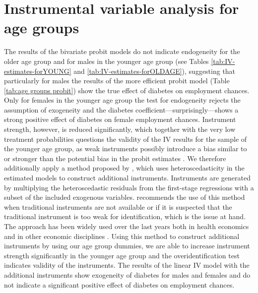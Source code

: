 \clearpage


\section{Instrumental variable analysis for age groups}

\setcounter{table}{0} 
\renewcommand{\thetable}{D\arabic{table}}

The results of the bivariate probit models do not indicate
endogeneity for the older age group and for males in the younger age
group (see Tables \ref{tab:IV-estimates-forYOUNG} and \ref{tab:IV-estimates-forOLDAGE}),
suggesting that particularly for males the results of the more efficient
probit model (Table \ref{tab:age groups probit}) show the true effect
of diabetes on employment chances. Only for females in the younger
age group the test for endogeneity rejects the assumption of exogeneity
and the diabetes coefficient---surprisingly---shows a strong positive
effect of diabetes on female employment chances. Instrument strength,
however, is reduced significantly, which together with the very low
treatment probabilities questions the validity of the \ac{IV} results
for the sample of the younger age group, as weak instruments possibly
introduce a bias similar to or stronger than the potential bias in
the probit estimates \parencite{Staiger1997}. We therefore additionally
apply a method proposed by \textcite{Lewbel2012}, which uses heteroscedasticity
in the estimated models to construct additional instruments. Instruments
are generated by multiplying the heteroscedastic residuals from the
first-stage regressions with a subset of the included exogenous variables.
\textcite{Lewbel2012} recommends the use of this method when traditional
instruments are not available or if it is suspected that the traditional
instrument is too weak for identification, which is the issue at hand.
The approach has been widely used over the last years both in health
economics \parencite{Drichoutis2011,Kelly2012,Schroeter2012,Brown2014}
and in other economic disciplines \parencite{Huang2009a,Emran2012,Denny2013}.
Using this method to construct additional instruments by using our
age group dummies, we are able to increase instrument strength significantly
in the younger age group and the overidentification test indicates
validity of the instruments. The results of the linear \ac{IV} model
with the additional instruments show exogeneity of diabetes for males
and females and do not indicate a significant positive effect of diabetes
on employment chances.

